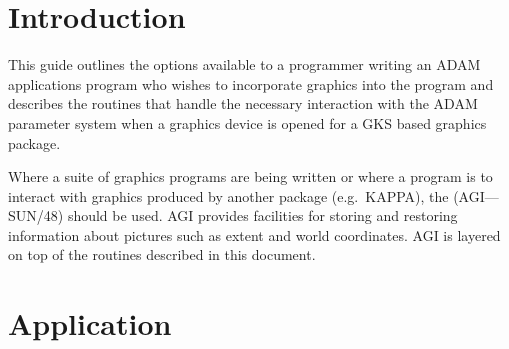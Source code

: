 %

\section{Introduction}

This guide outlines the options available to a programmer writing an ADAM
applications program who wishes to incorporate graphics into the program and
describes the routines that handle the necessary interaction with the ADAM 
parameter system when a graphics device is opened for a GKS based graphics
package.

Where a suite of graphics programs are being written or where a program is to
interact with graphics produced by another package (e.g.\ KAPPA), the
(AGI---SUN/48) should be used. AGI provides
facilities for storing and restoring information about pictures such as extent
and world coordinates. AGI is layered on top of the routines described in
this document.

\section{Application}

